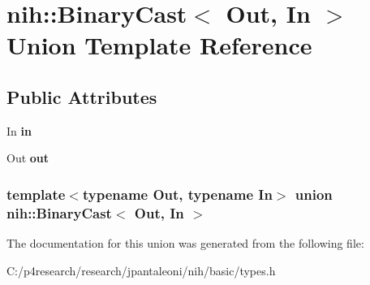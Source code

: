 \hypertarget{unionnih_1_1_binary_cast}{
\section{nih\-:\-:\-Binary\-Cast$<$ \-Out, \-In $>$ \-Union \-Template \-Reference}
\label{unionnih_1_1_binary_cast}
}
\subsection*{\-Public \-Attributes}
\begin{DoxyCompactItemize}
\item 
\hypertarget{unionnih_1_1_binary_cast_a23b9610bf7b602a5ae6d0230054198c4}{
\-In {\bfseries in}}
\label{unionnih_1_1_binary_cast_a23b9610bf7b602a5ae6d0230054198c4}

\item 
\hypertarget{unionnih_1_1_binary_cast_a95dcf1c1b1c7a37539dd71e980c34a02}{
\-Out {\bfseries out}}
\label{unionnih_1_1_binary_cast_a95dcf1c1b1c7a37539dd71e980c34a02}

\end{DoxyCompactItemize}
\subsubsection*{template$<$typename \-Out, typename \-In$>$ union nih\-::\-Binary\-Cast$<$ Out, In $>$}



\-The documentation for this union was generated from the following file\-:\begin{DoxyCompactItemize}
\item 
\-C\-:/p4research/research/jpantaleoni/nih/basic/types.\-h\end{DoxyCompactItemize}
